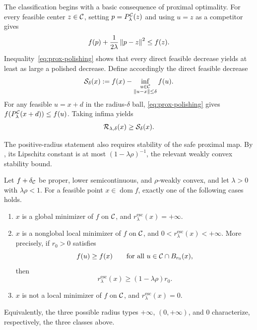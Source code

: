 The classification begins with a basic consequence of proximal optimality.
For every feasible center \(z\in\mathcal{C}\), setting
\(p=P_\lambda^{\mathcal{C}}(z)\) and using \(u=z\) as a competitor gives
\begin{equation}
  f(p)+\frac{1}{2\lambda}\left\lVert p-z\right\rVert^{2}
  \le f(z).
  \label{eq:prox-polishing}
\end{equation}
Inequality~\eqref{eq:prox-polishing} shows that every direct feasible decrease
yields at least as large a polished decrease.  Define accordingly the direct
feasible decrease
\begin{equation}
  \mathcal{S}_\delta(x)
  :=
  f(x)
  -\inf_{\substack{u\in\mathcal{C}\\\left\lVert u-x\right\rVert\le\delta}}f(u).
  \label{eq:direct-drop}
\end{equation}
For any feasible \(u=x+d\) in the radius-\(\delta\) ball,
\cref{eq:prox-polishing} gives
\(f(P_\lambda^{\mathcal{C}}(x+d))\le f(u)\).  Taking infima yields
\begin{equation}
  \mathcal{R}_{\lambda,\delta}(x)\ge\mathcal{S}_\delta(x).
  \label{eq:prox-dominates-direct}
\end{equation}

The positive-radius statement also requires stability of the safe proximal
map.  By , its Lipschitz constant is at most
\((1-\lambda\rho)^{-1}\), the relevant weakly convex stability bound.

\begin{theorem}
  \label{thm:radius-classification}
  Let \(f+\delta_{\mathcal{C}}\) be proper, lower semicontinuous, and
  \(\rho\)-weakly convex, and let \(\lambda>0\) with \(\lambda\rho<1\).  For a feasible point
  \(x\in\operatorname{dom} f\), exactly one of the following cases holds.
  \begin{enumerate}[label=(\roman*)]
    \item \(x\) is a global minimizer of \(f\) on \(\mathcal{C}\), and
          \(r_{\lambda}^{\mathrm{esc}}(x)=+\infty\).
    \item \(x\) is a nonglobal local minimizer of \(f\) on \(\mathcal{C}\), and
          \(0<r_{\lambda}^{\mathrm{esc}}(x)<+\infty\).  More precisely, if
          \(r_0>0\) satisfies
          \[
            f(u)\ge f(x)
            \qquad
            \text{for all }u\in\mathcal{C}\cap B_{r_0}(x),
          \]
          then
          \begin{equation}
            r_{\lambda}^{\mathrm{esc}}(x)
            \ge(1-\lambda\rho)r_0.
            \label{eq:escape-radius-lower}
          \end{equation}
    \item \(x\) is not a local minimizer of \(f\) on \(\mathcal{C}\), and
          \(r_{\lambda}^{\mathrm{esc}}(x)=0\).
  \end{enumerate}
  Equivalently, the three possible radius types \(+\infty\), \((0,+\infty)\),
  and \(0\) characterize, respectively, the three classes above.
\end{theorem}

